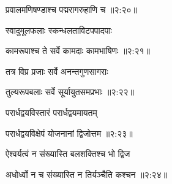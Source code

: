
{\devanagarifont प्रवालमणिषण्डाश्च पद्मरागरुहाणि च {॥२:२०॥} \veg\dontdisplaylinenum }%

{\devanagarifont स्वादुमूलफलाः स्कन्धलताविटपपादपाः \thinspace{\dandab} \dontdisplaylinenum }%


{\devanagarifont कामरूपाश्च ते सर्वे कामदाः कामभाषिणः {॥२:२१॥} \veg\dontdisplaylinenum }%
  
{\devanagarifont तत्र विप्र प्रजाः सर्वे अनन्तगुणसागराः \thinspace{\dandab} \dontdisplaylinenum }%
 

{\devanagarifont तुल्यरूपबलाः सर्वे सूर्यायुतसमप्रभाः {॥२:२२॥} \veg\dontdisplaylinenum }%

{\devanagarifont परार्धद्वयविस्तारं परार्धद्वयमायतम् \thinspace{\dandab} \dontdisplaylinenum }%
 

{\devanagarifont परार्धद्वयविक्षेपं योजनानां द्विजोत्तम {॥२:२३॥} \veg\dontdisplaylinenum }%

{\devanagarifont ऐश्वर्यत्वं न संख्यास्ति बलशक्तिश्च भो द्विज \thinspace{\dandab} \dontdisplaylinenum }%


{\devanagarifont अधोर्ध्वो न च संख्यास्ति न तिर्यञ्चैति कश्चन {॥२:२४॥} \veg\dontdisplaylinenum }%

